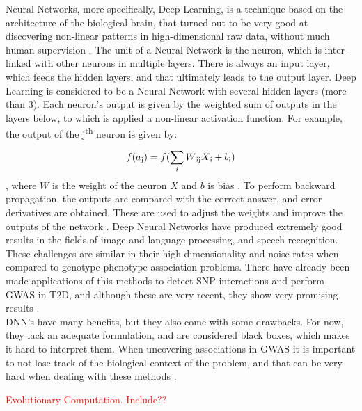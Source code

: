 Neural Networks, more specifically, Deep Learning, is a technique based on the architecture of the biological brain, that turned out to be very good at discovering non-linear patterns in high-dimensional raw data, without much human supervision \cite{mamoshina2016applications}. The unit of a Neural Network is the neuron, which is inter-linked with other neurons in multiple layers. There is always an input layer, which feeds the hidden layers, and that ultimately leads to the output layer. Deep Learning is considered to be a Neural Network with several hidden layers (more than 3). Each neuron's output is given by the weighted sum of outputs in the layers below, to which is applied a non-linear activation function. For example, the output of the j\textsuperscript{th} neuron is given by: \[f(a\textsubscript{j}) = f(\sum_{i}^{}W\textsubscript{ij}X\textsubscript{i} + b\textsubscript{i})\], where $W$ is the weight of the neuron $X$ and $b$ is bias \cite{lecun2015deep}. To perform backward propagation, the outputs are compared with the correct answer, and error derivatives are obtained. These are used to adjust the weights and improve the outputs of the network \cite{lecun2015deep, uppu2016towards}. Deep Neural Networks have produced extremely good results in the fields of image and language processing, and speech recognition. These challenges are similar in their high dimensionality and noise rates when compared to  genotype-phenotype association problems. There have already been made applications of this methods to detect SNP interactions and perform GWAS in T2D, and although these are very recent, they show very promising results \cite{uppu2016deep, fergus2018utilising, kim2017genetic}.\\
DNN's have many benefits, but they also come with some drawbacks. For now, they lack an adequate formulation, and are considered black boxes, which makes it hard to interpret them. When uncovering associations in GWAS it is important to not lose track of the biological context of the problem, and that can be very hard when dealing with these methods \cite{mamoshina2016applications}.


\textcolor{red}{Evolutionary Computation. Include??}


